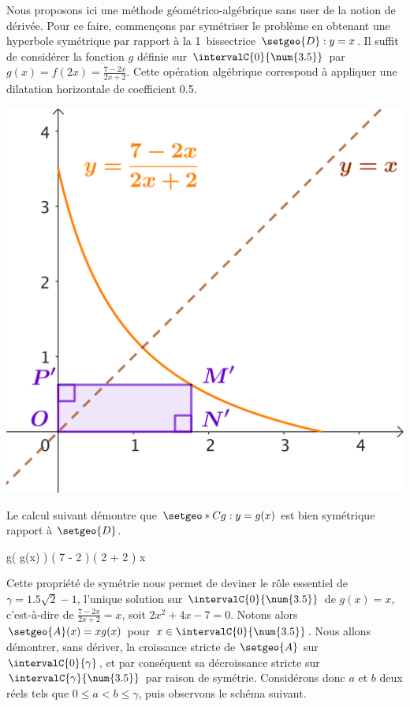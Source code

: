 Nous proposons ici une méthode géométrico-algébrique sans user de la notion de dérivée.
%
Pour ce faire, commençons par symétriser le problème en obtenant une hyperbole symétrique par rapport à la 1\iere\ bissectrice $\setgeo{D}: y = x$.
Il suffit de considérer la fonction $g$ définie sur $\intervalC{0}{\num{3.5}}$ par $g(x) = f(2x) = \frac{7-2x}{2x+2}$. Cette opération algébrique correspond à appliquer une dilatation horizontale de coefficient \num{.5}.

\smallskip

\begin{center}
    \includegraphics[scale=.67]{symmetric-goal.png}
\end{center}

Le calcul suivant démontre que $\setgeo*{C}{g}: y = g(x)$ est bien symétrique rapport à $\setgeo{D}$.

\smallskip
\begin{stepcalc}[style=sar]
    g\big( g(x) \big)
\explnext{}
         \Big( 7 - 2 \cdot {} \Big)
    \div \Big( 2 \cdot {} + 2 \Big)
\explnext{}
\explnext{}
\explnext{}
    x
\end{stepcalc}
\smallskip




Cette propriété de symétrie nous permet de deviner le rôle essentiel de
$\gamma = \num{1.5} \sqrt{2} - 1$, %
l'unique solution sur $\intervalC{0}{\num{3.5}}$ de
$g(x) = x$,
c'est-à-dire de
$\frac{7-2x}{2x+2} = x$,
soit
$2 x^2 + 4 x - 7 = 0$.
%
Notons alors $\setgeo{A}(x) = x g(x)$ pour $x \in \intervalC{0}{\num{3.5}}$.
Nous allons démontrer, sans dériver, la croissance stricte de $\setgeo{A}$ sur $\intervalC{0}{\gamma}$, et par conséquent sa décroissance stricte sur $\intervalC{\gamma}{\num{3.5}}$ par raison de symétrie.
%
Considérons donc $a$ et $b$ deux réels tels que $0 \leq a < b \leq \gamma$, puis observons le schéma suivant.

